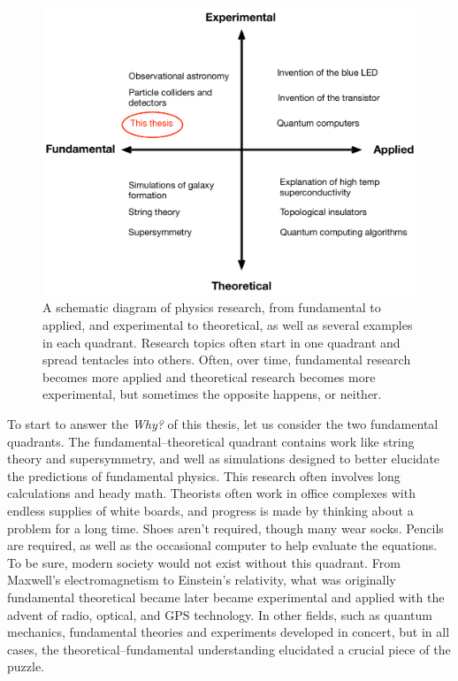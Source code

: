 \begin{figure}
\includegraphics[width=6in]{cocktail_party_intro/types_of_physics_research.pdf}
\caption{A schematic diagram of physics research, from fundamental to applied, and experimental to theoretical, as well as several examples in each quadrant. Research topics often start in one quadrant and spread tentacles into others. Often, over time, fundamental research becomes more applied and theoretical research becomes more experimental, but sometimes the opposite happens, or neither. }
\label{fig:typesofphysicsresearch}
\end{figure}

To start to answer the \emph{Why?} of this thesis, let us consider the two fundamental quadrants. The fundamental--theoretical quadrant contains work like string theory and supersymmetry, and well as simulations designed to better elucidate the predictions of fundamental physics. This research often involves long calculations and heady math. Theorists often work in office complexes with endless supplies of white boards, and progress is made by thinking about a problem for a long time. Shoes aren't required, though many wear socks. Pencils are required, as well as the occasional computer to help evaluate the equations. To be sure, modern society would not exist without this quadrant. From Maxwell's electromagnetism to Einstein's relativity, what was originally fundamental theoretical became later became experimental and applied with the advent of radio, optical, and GPS technology. In other fields, such as quantum mechanics, fundamental theories and experiments developed in concert, but in all cases, the theoretical--fundamental understanding elucidated a crucial piece of the puzzle. 

